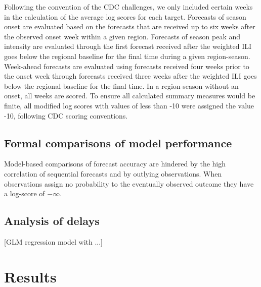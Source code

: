 \documentclass{article}
\begin{document}
Following the convention of the CDC challenges, we only included certain weeks in the calculation of the average log scores for each target.
Forecasts of season onset are evaluated based on the forecasts that are received up to six weeks after the observed onset week within a given region.
Forecasts of season peak and intensity are evaluated through the first forecast received after the weighted ILI goes below the regional baseline for the final time during a given region-season. 
Week-ahead forecasts are evaluated using forecasts received four weeks prior to the onset week through forecasts received three weeks after the weighted ILI goes below the regional baseline for the final time.
In a region-season without an onset, all weeks are scored.
To ensure all calculated summary measures would be finite, all modified log scores with values of less than -10 were assigned the value -10, following CDC scoring conventions.

\subsection{Formal comparisons of model performance}

Model-based comparisons of forecast accuracy are hindered by the high correlation of sequential forecasts and by outlying observations. 
When observations assign no probability to the eventually observed outcome they have a log-score of $-\infty$.


\subsection{Analysis of delays}
[GLM regression model with ...]

\section{Results}
\end{document}
